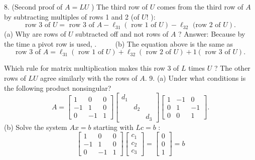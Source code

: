 8. (Second proof of $A=L U$ ) The third row of $U$ comes from the third row of $A$ by subtracting multiples of rows 1 and 2 (of $U!$ ):
$$
\text { row } \left.3 \text { of } U=\text { row } 3 \text { of } A-\ell_{31}(\text { row } 1 \text { of } U)-\ell_{32} \text { (row } 2 \text { of } U\right) \text {. }
$$
(a) Why are rows of $U$ subtracted off and not rows of $A$ ? Answer: Because by the time a pivot row is used, . $\qquad$
(b) The equation above is the same as
$$
\text { row } 3 \text { of } A=\ell_{31}(\text { row } 1 \text { of } U)+\ell_{32}(\text { row } 2 \text { of } U)+1(\text { row } 3 \text { of } U) \text {. }
$$

Which rule for matrix multiplication makes this row 3 of $L$ times $U$ ?
The other rows of $L U$ agree similarly with the rows of $A$.
9. (a) Under what conditions is the following product nonsingular?
$$
A=\left[\begin{array}{ccc}
1 & 0 & 0 \\
-1 & 1 & 0 \\
0 & -1 & 1
\end{array}\right]\left[\begin{array}{lll}
d_1 & & \\
& d_2 & \\
& & d_3
\end{array}\right]\left[\begin{array}{ccc}
1 & -1 & 0 \\
0 & 1 & -1 \\
0 & 0 & 1
\end{array}\right] .
$$
(b) Solve the system $A x=b$ starting with $L c=b$ :
$$
\left[\begin{array}{ccc}
1 & 0 & 0 \\
-1 & 1 & 0 \\
0 & -1 & 1
\end{array}\right]\left[\begin{array}{l}
c_1 \\
c_2 \\
c_3
\end{array}\right]=\left[\begin{array}{l}
0 \\
0 \\
1
\end{array}\right]=b
$$
